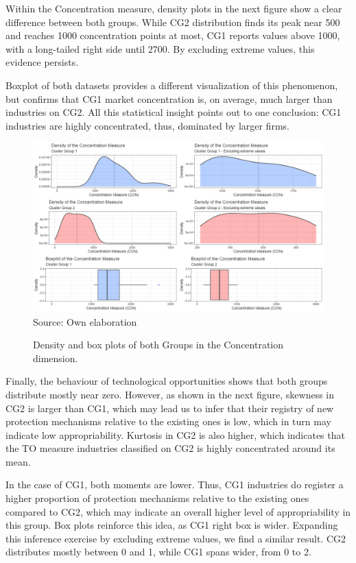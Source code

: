 \documentclass[12pt,a4paper]{article}
\begin{document}
Within the Concentration measure, density plots in the next figure show a clear difference between both groups.  While CG2 distribution finds its peak near 500 and reaches 1000 concentration points at most, CG1 reports values above 1000, with a long-tailed right side until 2700. By excluding extreme values, this evidence persists. 

Boxplot of both datasets provides a different visualization of this phenomenon, but confirms that CG1 market concentration is, on average, much larger than industries on CG2. All this statistical insight points out to one conclusion: CG1 industries are highly concentrated, thus, dominated by larger firms. 

\begin{figure}[H]	
	\caption{Density and box plots of both Groups in the Concentration dimension.}
	\centering
	\includegraphics[scale = 0.45]{pcon.png}
		Source: Own elaboration
\end{figure}

Finally, the behaviour of technological opportunities shows that both groups distribute mostly near zero. However, as shown in the next figure, skewness in CG2 is larger than CG1, which may lead us to infer that their registry of new protection mechanisms relative to the existing ones is low, which in turn may indicate low appropriability. Kurtosis in CG2 is also higher, which indicates that the TO measure industries classified on CG2 is highly concentrated around its mean. 

In the case of CG1, both moments are lower. Thus, CG1 industries do register a higher proportion of protection mechanisms relative to the existing ones compared to CG2, which may indicate an overall higher level of appropriability in this group. Box plots reinforce this idea, as CG1 right box is wider. Expanding this inference exercise by excluding extreme values, we find a similar result. CG2 distributes mostly between 0 and 1, while CG1 spans wider, from 0 to 2.
\end{document}
